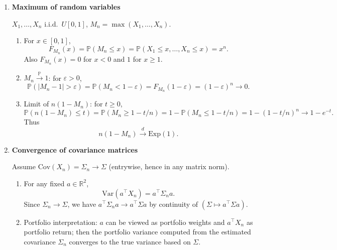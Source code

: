 \documentclass[11pt]{article}
\begin{document}
\begin{enumerate}
\begin{enumerate}
\item Then
\[
\frac{X_n}{\sigma}=\sqrt{n}\,\frac{\bar X_n-m}{\sigma}\xrightarrow{d}\mathcal{N}(0,1).
\]

\item If $\hat\sigma_n\to\sigma$ in probability (e.g.\ consistent estimator), then $\sigma/\hat\sigma_n\xrightarrow{\mathbb{P}}1$.
By Slutsky,
\[
\frac{X_n}{\hat\sigma_n}
=
\frac{X_n}{\sigma}\cdot \frac{\sigma}{\hat\sigma_n}
\xrightarrow{d} \mathcal{N}(0,1)\cdot 1
=
\mathcal{N}(0,1).
\]
\end{enumerate}

\bigskip

\item \textbf{Maximum of random variables}

$X_1,\dots,X_n$ i.i.d.\ $U[0,1]$, $M_n=\max(X_1,\dots,X_n)$.

\begin{enumerate}
\item For $x\in[0,1]$,
\[
F_{M_n}(x)=\mathbb{P}(M_n\le x)=\mathbb{P}(X_1\le x,\dots,X_n\le x)=x^n.
\]
Also $F_{M_n}(x)=0$ for $x<0$ and $1$ for $x\ge1$.

\item $M_n\xrightarrow{\mathbb{P}}1$:
for $\varepsilon>0$,
\[
\mathbb{P}(|M_n-1|>\varepsilon)=\mathbb{P}(M_n<1-\varepsilon)=F_{M_n}(1-\varepsilon)=(1-\varepsilon)^n\to 0.
\]

\item Limit of $n(1-M_n)$:
for $t\ge0$,
\[
\mathbb{P}(n(1-M_n)\le t)=\mathbb{P}(M_n\ge 1-t/n)=1-\mathbb{P}(M_n\le 1-t/n)
=1-(1-t/n)^n \to 1-e^{-t}.
\]
Thus
\[
n(1-M_n)\xrightarrow{d}\mathrm{Exp}(1).
\]
\end{enumerate}

\bigskip

\item \textbf{Convergence of covariance matrices}

Assume $\mathrm{Cov}(X_n)=\Sigma_n\to\Sigma$ (entrywise, hence in any matrix norm).

\begin{enumerate}
\item For any fixed $a\in\mathbb{R}^2$,
\[
\mathrm{Var}(a^\top X_n)=a^\top \Sigma_n a.
\]
Since $\Sigma_n\to\Sigma$, we have $a^\top \Sigma_n a\to a^\top \Sigma a$ by continuity of $(\Sigma\mapsto a^\top\Sigma a)$.

\item Portfolio interpretation:
$a$ can be viewed as portfolio weights and $a^\top X_n$ as portfolio return; then the portfolio variance computed from the estimated covariance $\Sigma_n$ converges to the true variance based on $\Sigma$.
\end{enumerate}


\end{enumerate}
\end{document}
